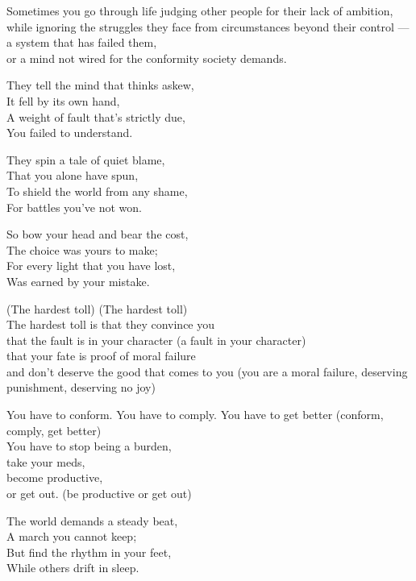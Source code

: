 \begin{lyrics}
Sometimes you go through life judging other people for their lack of ambition,\\
while ignoring the struggles they face from circumstances beyond their control
—a system that has failed them,\\
or a mind not wired for the conformity society demands.

They tell the mind that thinks askew,\\
It fell by its own hand,\\
A weight of fault that's strictly due,\\
You failed to understand.

They spin a tale of quiet blame,\\
That you alone have spun,\\
To shield the world from any shame,\\
For battles you've not won.

So bow your head and bear the cost,\\
The choice was yours to make;\\
For every light that you have lost,\\
Was earned by your mistake.

(The hardest toll)
(The hardest toll)\\
The hardest toll is that they convince you\\
that the fault is in your character
(a fault in your character)\\
that your fate is proof of moral failure\\
and don't deserve the good that comes to you
(you are a moral failure, deserving punishment, deserving no joy)

You have to conform. You have to comply. You have to get better
(conform, comply, get better)\\
You have to stop being a burden,\\
take your meds,\\
become productive,\\
or get out.
(be productive or get out)

The world demands a steady beat,\\
A march you cannot keep;\\
But find the rhythm in your feet,\\
While others drift in sleep.


\end{lyrics}
